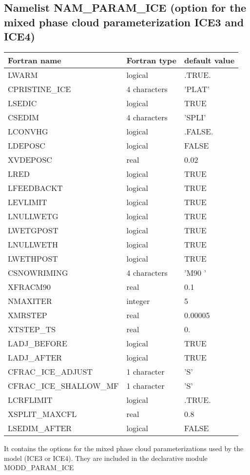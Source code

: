 \subsection{Namelist NAM\_PARAM\_ICE (option for the mixed phase cloud 
parameterization ICE3 and ICE4)}
%
\begin{longtable} {|p{}|p{}|p{}|}
\hline
Fortran name &  Fortran type & default value \\
\hline 
\endhead
\hline
\endfoot
LWARM         &  logical     & .TRUE. \\
CPRISTINE\_ICE & 4 characters & 'PLAT' \\
LSEDIC & logical & TRUE \\
CSEDIM & 4 characters & 'SPLI' \\
LCONVHG       &  logical     & .FALSE. \\
LDEPOSC& logical & FALSE \\
XVDEPOSC& real & 0.02 \\
LRED & logical & TRUE \\
LFEEDBACKT & logical & TRUE \\
LEVLIMIT & logical & TRUE \\
LNULLWETG & logical & TRUE \\
LWETGPOST & logical & TRUE \\
 LNULLWETH & logical & TRUE \\
LWETHPOST & logical & TRUE \\
CSNOWRIMING & 4 characters & 'M90 ' \\
XFRACM90 & real & 0.1 \\
NMAXITER & integer & 5 \\
XMRSTEP & real & 0.00005 \\
XTSTEP\_TS & real & 0. \\
LADJ\_BEFORE & logical & TRUE \\
LADJ\_AFTER & logical & TRUE \\
CFRAC\_ICE\_ADJUST  & 1 character & 'S' \\
CFRAC\_ICE\_SHALLOW\_MF& 1 character & 'S' \\
LCRFLIMIT &  logical     & .TRUE. \\
XSPLIT\_MAXCFL& real & 0.8 \\
LSEDIM\_AFTER & logical & FALSE \\

\end{longtable}

It contains the options for the mixed phase cloud parameterizations
used  by the model (ICE3 or ICE4). They are included in the declarative module
MODD\_PARAM\_ICE

